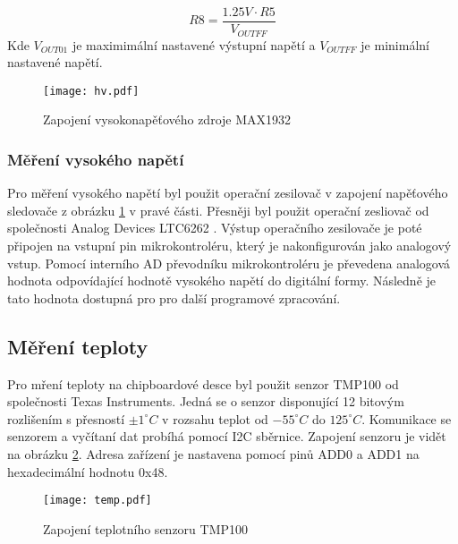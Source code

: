 	\begin{equation}
		R8 = \frac{1.25V \cdot R5}{V_{OUTFF}}
		\label{eq:R6}
	\end{equation}
	Kde $V_{OUT01}$ je maximimální nastavené výstupní napětí a $V_{OUTFF}$ je minimální nastavené napětí. 
	
	\begin{figure}[h!]
		\centering
		\captionsetup{justification=centering}
		\texttt{[image: hv.pdf]}
		\caption{Zapojení vysokonapěťového zdroje MAX1932} 
		\label{fig:hv}
	\end{figure} 
	\subsubsection{Měření vysokého napětí} %
	Pro měření vysokého napětí byl použit operační zesilovač v zapojení napěťového sledovače z obrázku \ref{fig:hv} v pravé části. Přesněji byl použit operační zesliovač od společnosti Analog Devices LTC6262 \cite{LTC6252}. Výstup operačního zesilovače je poté připojen na vstupní pin mikrokontroléru, který je nakonfigurován jako analogový vstup. Pomocí interního AD převodníku mikrokontroléru je převedena analogová hodnota odpovídající hodnotě vysokého napětí do digitální formy. Následně je tato hodnota dostupná pro pro další programové zpracování. 

	\subsection{Měření teploty}	%
	\label{Mereni teploty}
	Pro mření teploty na chipboardové desce byl použit senzor TMP100 \cite{TMP100} od společnosti Texas Instruments. Jedná se o senzor disponující 12 bitovým rozlišením s přesností $\pm 1^{\circ} C$ v rozsahu teplot od $-55^{\circ}C$ do $125^{\circ}C$. Komunikace se senzorem a vyčítaní dat probíhá pomocí I2C sběrnice. Zapojení senzoru je vidět na obrázku \ref{fig:tmp100}. Adresa zařízení je nastavena pomocí pinů ADD0 a ADD1 na hexadecimální hodnotu 0x48.
	\begin{figure}[h!]
		\centering
		\captionsetup{justification=centering}
		\texttt{[image: temp.pdf]}
		\caption{Zapojení teplotního senzoru TMP100} 
		\label{fig:tmp100}
	\end{figure} 
